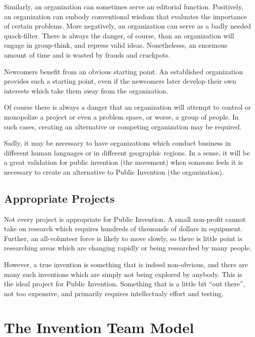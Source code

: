 \documentclass[
	fontsize=10pt, %
	twoside=false, %
	secnumdepth=1, %
]{kaobook}
\begin{document}
Similarly, an organization can sometimes serve an editorial function.
Positively, an organization can embody conventional wisdom that
evaluates the importance of certain problems.
More negatively, an organization can serve as a badly needed quack-filter.
There is always the danger, of course, than an organization will engage in group-think,
and repress valid ideas.
Nonethelesss, an enormous amount of time and is wasted by frauds and crackpots.

Newcomers benefit from an obvious starting point.
An established organization provides such a starting point, even if the newcomers
later develop their own interests which take them away from the organization.

Of course there is always a danger that an organization will attempt to control or monopolize
a project or even a problem space, or worse, a group of people.
In such cases, creating an alternative or competing organization
may be required.

Sadly, it may be necessary to have organizations which conduct business in
different human languages or in different geographic regions.
In a sense, it will be a great validation for public invention (the movement) when
someone feels it is necessary to create an alternative to Public Invention (the organization).

\section{Appropriate Projects}

Not every project is appropriate for Public Invention.
A small non-profit cannot take on research which requires hundreds of thousands of dollars
in equipment. Further, an all-volunteer force is likely to move slowly, so there
is little point is researching areas which are changing rapidly or being
researched by many people.


However, a true invention is something that is indeed non-obvious, and there
are many such inventions which are simply not being explored by anybody.
This is the ideal project for Public Invention. Something that is a
little bit ``out there'', not too expensive, and primarily requires
intellectualy effort and testing.


\chapter{The Invention Team Model}
\end{document}
